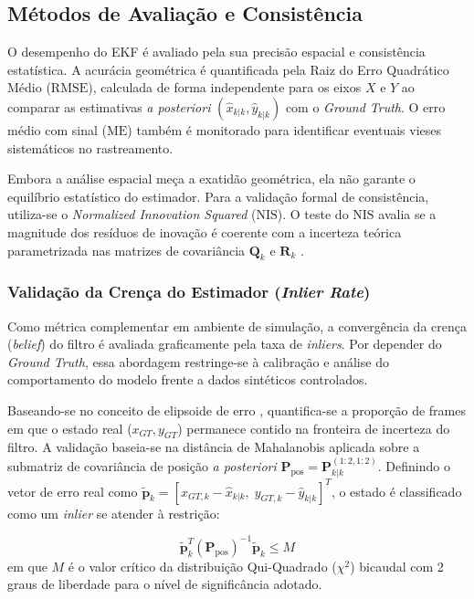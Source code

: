 \subsection{Métodos de Avaliação e Consistência}
\label{subsec:metricas_metodologia}

O desempenho do EKF é avaliado pela sua precisão espacial e consistência estatística. A acurácia geométrica é quantificada pela Raiz do Erro Quadrático Médio ($\text{RMSE}$), calculada de forma independente para os eixos $X$ e $Y$ ao comparar as estimativas \textit{a posteriori} $(\hat{x}_{k|k}, \hat{y}_{k|k})$ com o \textit{Ground Truth}. O erro médio com sinal ($\text{ME}$) também é monitorado para identificar eventuais vieses sistemáticos no rastreamento.

Embora a análise espacial meça a exatidão geométrica, ela não garante o equilíbrio estatístico do estimador. Para a validação formal de consistência, utiliza-se o \textit{Normalized Innovation Squared} ($\text{NIS}$). O teste do $\text{NIS}$ avalia se a magnitude dos resíduos de inovação é coerente com a incerteza teórica parametrizada nas matrizes de covariância $\mathbf{Q}_k$ e $\mathbf{R}_k$ \cite{barshalom2001estimation}.

\subsubsection{Validação da Crença do Estimador (\textit{Inlier Rate})}
\label{subsubsec:validacao_inliers}

Como métrica complementar em ambiente de simulação, a convergência da crença (\textit{belief}) do filtro é avaliada graficamente pela taxa de \textit{inliers}. Por depender do \textit{Ground Truth}, essa abordagem restringe-se à calibração e análise do comportamento do modelo frente a dados sintéticos controlados.

Baseando-se no conceito de elipsoide de erro \cite{thrun2005probabilistic}, quantifica-se a proporção de frames em que o estado real ($x_{GT}, y_{GT}$) permanece contido na fronteira de incerteza do filtro. A validação baseia-se na distância de Mahalanobis aplicada sobre a submatriz de covariância de posição \textit{a posteriori} $\mathbf{P}_{\text{pos}} = \mathbf{P}_{k|k}^{(1:2, 1:2)}$. Definindo o vetor de erro real como $\tilde{\mathbf{p}}_k = [x_{GT,k} - \hat{x}_{k|k}, \; y_{GT,k} - \hat{y}_{k|k}]^T$, o estado é classificado como um \textit{inlier} se atender à restrição:

\begin{equation}
    \tilde{\mathbf{p}}_k^T \left( \mathbf{P}_{\text{pos}} \right)^{-1} \tilde{\mathbf{p}}_k \le M
    \label{eq:condicao_inlier_quadratica}
\end{equation}
em que $M$ é o valor crítico da distribuição Qui-Quadrado ($\chi^2$) bicaudal com 2 graus de liberdade para o nível de significância adotado.


